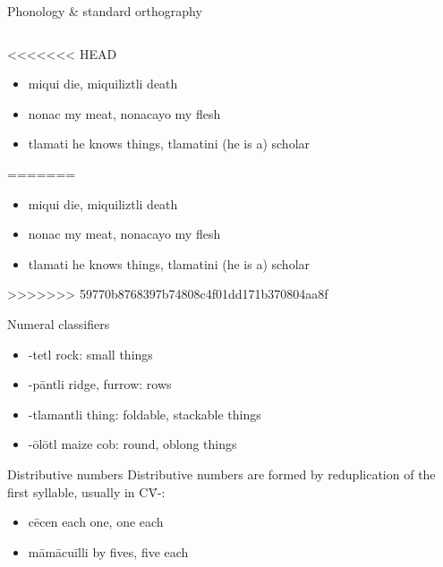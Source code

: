 \documentclass[12pt]{beamer}
\newcommand{\nah}[1]{\textcolor{nahgrn}{#1}}
\newcommand{\trs}[1]{\textcolor{nahblu}{#1}}
\begin{document}
\begin{frame}
\begin{columns}[t]
\begin{column}{.22\linewidth}
\begin{block}{Phonology \& standard orthography}
\begin{threeparttable}
\begin{tablenotes}
\begin{frame}
\begin{columns}[t]
\begin{column}{.22\linewidth}
      \begin{example}
<<<<<<< HEAD
        \vspace{-1.5ex}
        \begin{multicols}{2}
          \begin{itemize}
          \item \nah{miqui} \trs{die}, \nah{miquiliztli} \trs{death}
          \item \nah{nonac} \trs{my meat}, \nah{nonacayo} \trs{my flesh}
          \item \nah{tlamati} \trs{he knows things}, \nah{tlamatini} \trs{(he is a) scholar}
          \end{itemize}
        \end{multicols}
=======
        \begin{itemize}
          \item \nah{miqui} \trs{die}, \nah{miquiliztli} \trs{death}
          \item \nah{nonac} \trs{my meat}, \nah{nonacayo} \trs{my flesh}
          \item \nah{tlamati} \trs{he knows things}, \nah{tlamatini} \trs{(he is a) scholar}
        \end{itemize}
>>>>>>> 59770b8768397b74808c4f01dd171b370804aa8f
      \end{example}
      \begin{block}{Numeral classifiers}
        \begin{itemize}
          \item \nah{-tetl} \trs{rock}: small things
          \item \nah{-pāntli} \trs{ridge, furrow}: rows
          \item \nah{-tlamantli} \trs{thing}: foldable, stackable things
          \item \nah{-ōlōtl} \trs{maize cob}: round, oblong things
        \end{itemize}
      \end{block}
      \begin{block}{Distributive numbers}
        Distributive numbers are formed by reduplication of the first syllable, usually in \nah{C\=V-}:
        \begin{itemize}
          \item \nah{cēcen} \trs{each one, one each}
          \item \nah{māmācuīlli} \trs{by fives, five each}
        \end{itemize}
      \end{block}
    \end{column}


\end{columns}
\end{frame}
\end{tablenotes}
\end{threeparttable}
\end{block}
\end{column}
\end{columns}
\end{frame}
\end{document}
